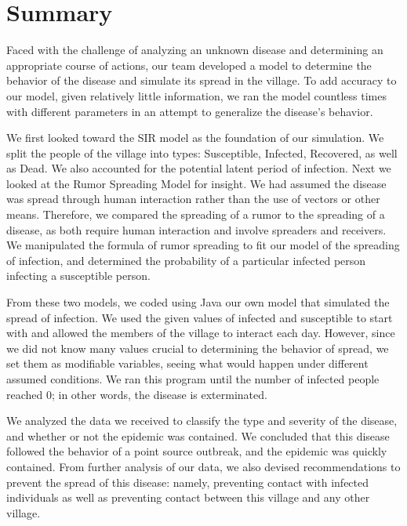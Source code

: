 \documentclass[11pt]{article}
\begin{document}
\cfoot{}

\section{Summary}
Faced with the challenge of analyzing an unknown disease and determining an appropriate course of actions, our team developed a model to determine the behavior of the disease and simulate its spread in the village. To add accuracy to our model, given relatively little information, we ran the model countless times with different parameters in an attempt to generalize the disease’s behavior.

We first looked toward the SIR model as the foundation of our simulation. We split the people of the village into types: Susceptible, Infected, Recovered, as well as Dead. We also accounted for the potential latent period of infection. Next we looked at the Rumor Spreading Model for insight. We had assumed the disease was spread through human interaction rather than the use of vectors or other means. Therefore, we compared the spreading of a rumor to the spreading of a disease, as both require human interaction and involve spreaders and receivers. We manipulated the formula of rumor spreading to fit our model of the spreading of infection, and determined the probability of a particular infected person infecting a susceptible person.

From these two models, we coded using Java our own model that simulated the spread of infection. We used the given values of infected and susceptible to start with and allowed the members of the village to interact each day. However, since we did not know many values crucial to determining the behavior of spread, we set them as modifiable variables, seeing what would happen under different assumed conditions. We ran this program until the number of infected people reached 0; in other words, the disease is exterminated.

We analyzed the data we received to classify the type and severity of the disease, and whether or not the epidemic was contained. We concluded that this disease followed the behavior of a point source outbreak, and the epidemic was quickly contained. From further analysis of our data, we also devised recommendations to prevent the spread of this disease: namely, preventing contact with infected individuals as well as preventing contact between this village and any other village.
\end{document}
